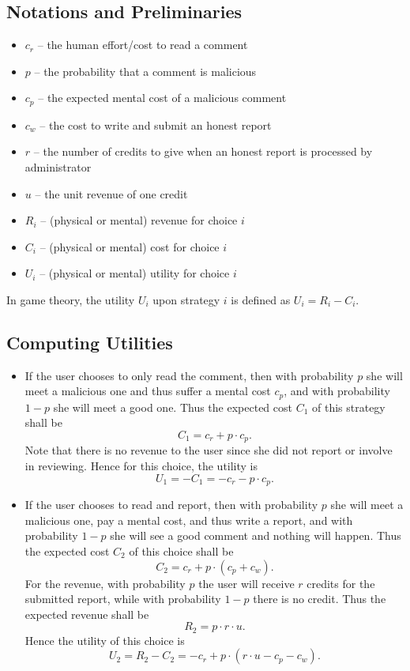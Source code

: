 \documentclass[12pt]{article}
\begin{document}
\subsection{Notations and Preliminaries}
\begin{itemize}
\item $c_r$ \--- the human effort/cost to read a comment
\item $p$ \--- the probability that a comment is malicious
\item $c_p$ \--- the expected mental cost of a malicious comment
\item $c_w$ \--- the cost to write and submit an honest report
\item $r$ \--- the number of credits to give when an honest report is processed by administrator
\item $u$ \--- the unit revenue of one credit
\item $R_i$ \--- (physical or mental) revenue for choice $i$
\item $C_i$ \--- (physical or mental) cost for choice $i$
\item $U_i$ \--- (physical or mental) utility for choice $i$
\end{itemize}
In game theory, the utility $U_i$ upon strategy $i$ is defined as $U_i = R_i - C_i$.

\subsection{Computing Utilities}
\begin{itemize}
\item If the user chooses to only read the comment, then with probability $p$ she will meet a malicious one and thus suffer a mental cost $c_p$, and with probability $1-p$ she will meet a good one. Thus the expected cost $C_1$ of this strategy shall be
$$C_1 = c_r + p\cdot c_p.$$
Note that there is no revenue to the user since she did not report or involve in reviewing. Hence for this choice, the utility is
$$U_1 = -C_1 = -c_r - p\cdot c_p.$$
\item If the user chooses to read and report, then with probability $p$ she will meet a malicious one, pay a mental cost, and thus write a report, and with probability $1-p$ she will see a good comment and nothing will happen. Thus the expected cost $C_2$ of this choice shall be
$$C_2 = c_r + p\cdot(c_p + c_w).$$
For the revenue, with probability $p$ the user will receive $r$ credits for the submitted report, while with probability $1-p$ there is no credit. Thus the expected revenue shall be 
$$R_2 = p\cdot r\cdot u.$$
Hence the utility of this choice is
$$U_2 = R_2 - C_2 = -c_r + p\cdot(r\cdot u -c_p-c_w).$$
\end{itemize}
\end{document}
